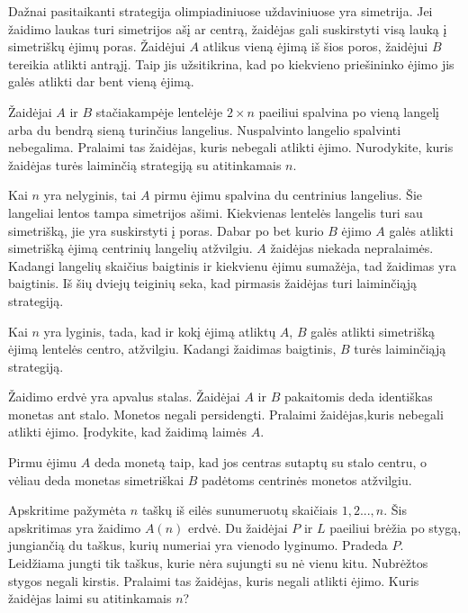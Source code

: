 Dažnai pasitaikanti strategija olimpiadiniuose uždaviniuose yra simetrija.
Jei žaidimo laukas turi simetrijos ašį ar centrą, žaidėjas gali suskirstyti
visą lauką į simetriškų ėjimų poras. Žaidėjui $A$ atlikus vieną ėjimą iš šios
poros, žaidėjui $B$ tereikia atlikti antrąjį. Taip jis užsitikrina, kad po
kiekvieno priešininko ėjimo jis galės atlikti dar bent vieną ėjimą.

\begin{pavnr}
  Žaidėjai $A$ ir $B$ stačiakampėje lentelėje $ 2\times n$ paeiliui spalvina po
  vieną langelį arba du bendrą sieną turinčius langelius. Nuspalvinto
  langelio spalvinti nebegalima. Pralaimi tas žaidėjas, kuris nebegali
  atlikti ėjimo. Nurodykite, kuris žaidėjas turės laiminčią strategiją su
  atitinkamais $n$. 
\end{pavnr}

Kai $n$ yra nelyginis, tai $A$ pirmu ėjimu spalvina du centrinius
langelius. Šie langeliai lentos tampa simetrijos ašimi. Kiekvienas lentelės
langelis turi sau simetrišką, jie yra suskirstyti į poras. Dabar po bet
kurio $B$ ėjimo $A$ galės atlikti simetrišką ėjimą centrinių langelių
atžvilgiu. $A$ žaidėjas niekada nepralaimės. Kadangi langelių skaičius
baigtinis ir kiekvienu ėjimu sumažėja, tad žaidimas yra baigtinis. Iš šių
dviejų teiginių seka, kad pirmasis žaidėjas turi laiminčiąją strategiją. 

Kai $n$ yra lyginis, tada, kad ir kokį ėjimą atliktų $A$, $B$ galės atlikti
simetrišką ėjimą lentelės centro, atžvilgiu. Kadangi žaidimas baigtinis,
$B$ turės laiminčiąją strategiją. 

\begin{pavnr}
  Žaidimo erdvė yra apvalus stalas. Žaidėjai $A$ ir $B$ pakaitomis deda
  identiškas monetas ant stalo. Monetos negali persidengti. Pralaimi
  žaidėjas,kuris nebegali atlikti ėjimo. Įrodykite, kad žaidimą laimės $A$. 
\end{pavnr}

Pirmu ėjimu $A$ deda monetą taip, kad jos centras sutaptų su stalo centru, o
vėliau deda monetas simetriškai $B$ padėtoms centrinės monetos atžvilgiu. 

\begin{pavnr}
  Apskritime pažymėta $n$ taškų iš eilės sunumeruotų skaičiais $1,2...,n$. Šis
  apskritimas yra žaidimo $A(n)$ erdvė. Du žaidėjai $P$ ir $L$ paeiliui brėžia po
  stygą, jungiančią du taškus, kurių numeriai yra vienodo lyginumo. Pradeda
  $P$. Leidžiama jungti tik taškus, kurie nėra sujungti su nė vienu kitu.
  Nubrėžtos stygos negali kirstis. Pralaimi tas žaidėjas, kuris negali
  atlikti ėjimo. Kuris žaidėjas laimi su atitinkamais $n$?
\end{pavnr}

